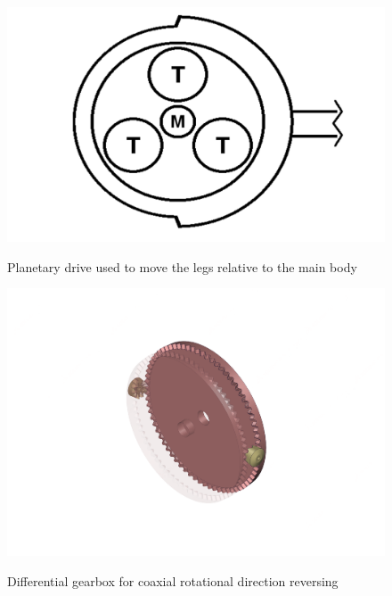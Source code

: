 \documentclass[11pt]{article}		%
\newlength{\imageheight}	 %
\begin{document}
				\begin{figure}[h]
					\centering
					\begin{multicols}{2}
						\includegraphics[height=\imageheight]{planetaryDrive}
						\caption{Planetary drive used to move the legs relative to the main body}
						\label{planetaryDrive}
						\columnbreak
						\includegraphics[height=\imageheight]{diffGearbox}
						\caption{Differential gearbox for coaxial rotational direction reversing}
						\label{diffGearbox}
					\end{multicols}
				\end{figure}
				
\end{document}
